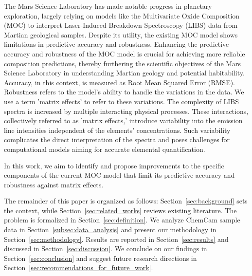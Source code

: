 The Mars Science Laboratory has made notable progress in planetary exploration, largely relying on models like the Multivariate Oxide Composition (MOC) to interpret Laser-Induced Breakdown Spectroscopy (LIBS) data from Martian geological samples.
Despite its utility, the existing MOC model shows limitations in predictive accuracy and robustness.
Enhancing the predictive accuracy and robustness of the MOC model is crucial for achieving more reliable composition predictions, thereby furthering the scientific objectives of the Mars Science Laboratory in understanding Martian geology and potential habitability.
Accuracy, in this context, is measured as Root Mean Squared Error (RMSE).
Robustness refers to the model's ability to handle the variations in the data.
We use a term 'matrix effects' to refer to these variations.
The complexity of LIBS spectra is increased by multiple interacting physical processes.
These interactions, collectively referred to as 'matrix effects,' introduce variability into the emission line intensities independent of the elements' concentrations.
Such variability complicates the direct interpretation of the spectra and poses challenges for computational models aiming for accurate elemental quantification.\cite{andersonImprovedAccuracyQuantitative2017}

In this work, we aim to identify and propose improvements to the specific components of the current MOC model that limit its predictive accuracy and robustness against matrix effects.

The remainder of this paper is organized as follows:
Section~\ref{sec:background} sets the context, while Section~\ref{sec:related_works} reviews existing literature.
The problem is formalized in Section~\ref{sec:definition}.
We analyze ChemCam sample data in Section~\ref{subsec:data_analysis} and present our methodology in Section~\ref{sec:methodology}.
Results are reported in Section~\ref{sec:results} and discussed in Section~\ref{sec:discussion}.
We conclude on our findings in Section~\ref{sec:conclusion} and suggest future research directions in Section~\ref{sec:recommendations_for_future_work}.
